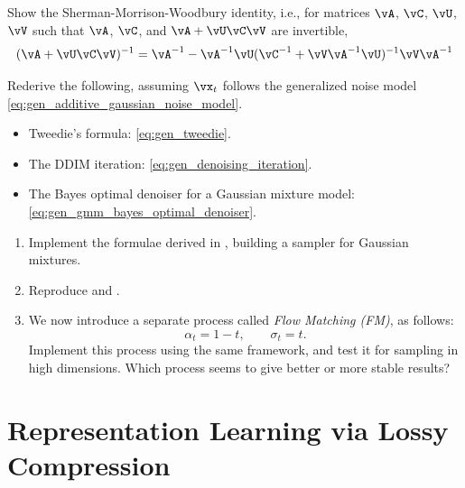 \documentclass[../../book-main.tex]{subfiles}
\begin{document}
\begin{exercise}\label{exercise:sherman_morrison_woodbury_identity}
    Show the Sherman-Morrison-Woodbury identity, i.e., for matrices \(\vA\), \(\vC\), \(\vU\), \(\vV\) such that \(\vA\), \(\vC\), and \(\vA + \vU\vC\vV\) are invertible,
    \begin{equation}
        (\vA + \vU\vC\vV)^{-1} = \vA^{-1} - \vA^{-1}\vU(\vC^{-1} + \vV\vA^{-1}\vU)^{-1}\vV\vA^{-1}
    \end{equation}
\end{exercise}

\begin{exercise}\label{exercise:generalizing_results_to_different_noise_models}
    Rederive the following, assuming \(\vx_{t}\) follows the generalized noise model \eqref{eq:gen_additive_gaussian_noise_model}.
    \begin{itemize}
        \item Tweedie's formula: \eqref{eq:gen_tweedie}.
        \item The DDIM iteration: \eqref{eq:gen_denoising_iteration}.
        \item The Bayes optimal denoiser for a Gaussian mixture model: \eqref{eq:gen_gmm_bayes_optimal_denoiser}.
    \end{itemize}
\end{exercise}

\begin{exercise}\label{exercise:implement_denoising_processes}
\begin{enumerate}
    \item Implement the formulae derived in , building a sampler for Gaussian mixtures.
    \item Reproduce  and .
    \item We now introduce a separate process called \textit{Flow Matching (FM)}, as follows:
    \begin{equation}
        \alpha_{t} = 1 - t, \qquad \sigma_{t} = t.
    \end{equation}
    Implement this process using the same framework, and test it for sampling in high dimensions. Which process seems to give better or more stable results?
\end{enumerate}
\end{exercise}


\chapter{Representation Learning via Lossy Compression}
\label{ch:lossy-compression}\label{ch:representation-learning}
\end{document}
